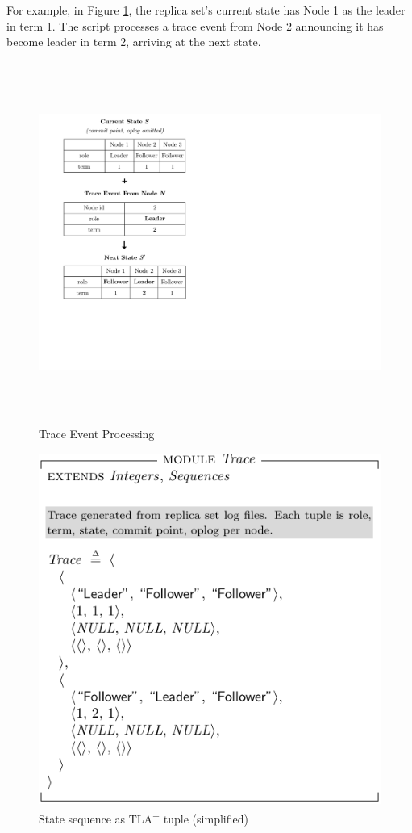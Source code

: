 \documentclass{vldb}
\begin{document}
For example, in Figure \ref{figure:event-processing}, the replica set's current state has Node 1 as the leader in term 1. 
The script processes a trace event from Node 2 announcing it has become leader in term 2, arriving at the next state.

\begin{figure}[b!]
\includegraphics[height=32em]{event-processing.pdf}
\caption{Trace Event Processing}
\label{figure:event-processing}
\end{figure}

\begin{figure}
\includegraphics{Trace.pdf}
\caption{State sequence as TLA\textsuperscript{+} tuple (simplified)}
\label{fig:state-sequence}
\end{figure}
\end{document}

